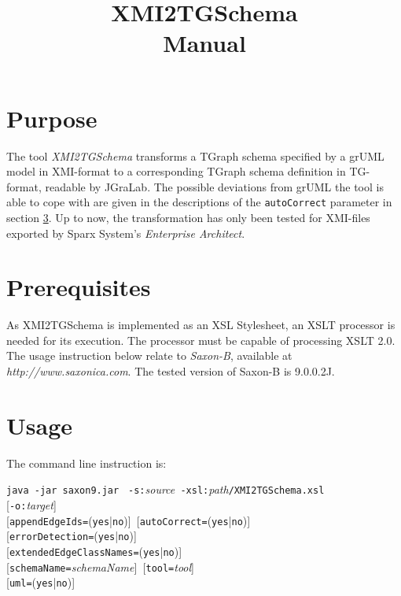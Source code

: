 \documentclass[a4paper]{article}
\title{\LARGE XMI2TGSchema\\Manual}
\begin{document}
	\maketitle
	\vspace{-6pt}
	
	\section{Purpose}
	The tool \emph{XMI2TGSchema} transforms a TGraph schema specified by a grUML model in XMI-format to a corresponding TGraph schema definition in TG-format, readable by JGraLab. The possible deviations from grUML the tool is able to cope with are given in the descriptions of the \texttt{autoCorrect} parameter in section \ref{sec:Usage}. Up to now, the transformation has only been tested for XMI-files exported by Sparx System's \emph{Enterprise Architect}.
	
	\section{Prerequisites}
	As XMI2TGSchema is implemented as an XSL Stylesheet, an XSLT processor is needed for its execution. The processor must be capable of processing XSLT 2.0. The usage instruction below relate to \emph{Saxon-B}, available at \emph{http://www.saxonica.com}. The tested version of Saxon-B is 9.0.0.2J.
	
	\section{Usage} \label{sec:Usage}
	The command line instruction is:
	
	\texttt{java -jar saxon9.jar } \texttt{-s:}\emph{source}\texttt{ -xsl:}\emph{path}\texttt{/XMI2TGSchema.xsl} \\
	\mbox{[}\texttt{-o:}\emph{target}] \\
	\mbox{[}\texttt{appendEdgeIds=}(\texttt{yes}|\texttt{no})]\texttt{ }[\texttt{autoCorrect=}(\texttt{yes}|\texttt{no})] \\
	\mbox{[}\texttt{errorDetection=}(\texttt{yes}|\texttt{no})] \\
	\mbox{[}\texttt{extendedEdgeClassNames=}(\texttt{yes}|\texttt{no})] \\
	\mbox{[}\texttt{schemaName=}\emph{schemaName}]\texttt{ }[\texttt{tool=}\emph{tool}] \\
	\mbox{[}\texttt{uml=}(\texttt{yes}|\texttt{no})] \\
\end{document}
